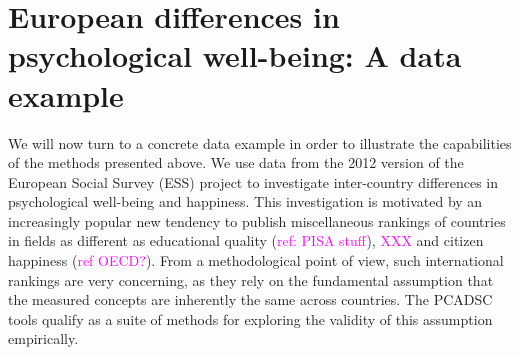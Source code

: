 \documentclass[titlepage,11pt,twoside]{article}
\newcommand{\hl}[1]{\textcolor{magenta}{#1}}
\begin{document}


\section{European differences in psychological well-being: A data example}
\label{sec:dataexample}
We will now turn to a concrete data example in order to illustrate the capabilities of the methods presented above. We use data from the 2012 version of the European Social Survey (ESS) project to investigate inter-country differences in psychological well-being and happiness. This investigation is motivated by an increasingly popular new tendency to publish miscellaneous rankings of countries in fields as different as educational quality (\hl{ref: PISA stuff}), \hl{XXX} and citizen happiness (\hl{ref OECD?}). From a methodological point of view, such international rankings are very concerning, as they rely on the fundamental assumption  that the measured concepts are inherently the same across countries. The PCADSC tools qualify as a suite of methods for exploring the validity of this assumption empirically.
\end{document}
